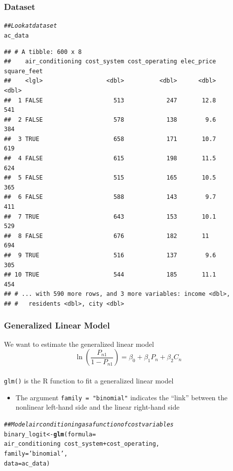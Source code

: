 \documentclass{beamer}\usepackage[]{graphicx}\usepackage[]{color}
\makeatletter
\newcommand{\hlstr}[1]{\textcolor[rgb]{0.192,0.494,0.8}{#1}}%
\newcommand{\hlcom}[1]{\textcolor[rgb]{0.678,0.584,0.686}{\textit{#1}}}%
\newcommand{\hlopt}[1]{\textcolor[rgb]{0,0,0}{#1}}%
\newcommand{\hlstd}[1]{\textcolor[rgb]{0.345,0.345,0.345}{#1}}%
\newcommand{\hlkwb}[1]{\textcolor[rgb]{0.69,0.353,0.396}{#1}}%
\newcommand{\hlkwc}[1]{\textcolor[rgb]{0.333,0.667,0.333}{#1}}%
\newcommand{\hlkwd}[1]{\textcolor[rgb]{0.737,0.353,0.396}{\textbf{#1}}}%
\newenvironment{kframe}{%
 \def\at@end@of@kframe{}%
 \ifinner\ifhmode%
  \def\at@end@of@kframe{\end{minipage}}%
  \begin{minipage}{\columnwidth}%
 \fi\fi%
 \def\FrameCommand##1{\hskip\@totalleftmargin \hskip-\fboxsep
 \colorbox{shadecolor}{##1}\hskip-\fboxsep
     \hskip-\linewidth \hskip-\@totalleftmargin \hskip\columnwidth}%
 \MakeFramed {\advance\hsize-\width
   \@totalleftmargin\z@ \linewidth\hsize
   \@setminipage}}%
 {\par\unskip\endMakeFramed%
 \at@end@of@kframe}
\newenvironment{knitrout}{}{} %
\makeatother
\begin{document}
\begin{frame}[fragile]\frametitle{Dataset}
\begin{knitrout}\footnotesize
{}\color{fgcolor}\begin{kframe}
\begin{alltt}
\hlcom{## Look at dataset}
\hlstd{ac_data}
\end{alltt}
\begin{verbatim}
## # A tibble: 600 x 8
##    air_conditioning cost_system cost_operating elec_price square_feet
##    <lgl>                  <dbl>          <dbl>      <dbl>       <dbl>
##  1 FALSE                    513            247       12.8         541
##  2 FALSE                    578            138        9.6         384
##  3 TRUE                     658            171       10.7         619
##  4 FALSE                    615            198       11.5         624
##  5 FALSE                    515            165       10.5         365
##  6 FALSE                    588            143        9.7         411
##  7 TRUE                     643            153       10.1         529
##  8 FALSE                    676            182       11           694
##  9 TRUE                     516            137        9.6         305
## 10 TRUE                     544            185       11.1         454
## # ... with 590 more rows, and 3 more variables: income <dbl>,
## #   residents <dbl>, city <dbl>
\end{verbatim}
\end{kframe}
\end{knitrout}
\end{frame}

\begin{frame}[fragile]\frametitle{Generalized Linear Model}
    We want to estimate the generalized linear model
    $$\ln \left( \frac{P_{n1}}{1 - P_{n1}} \right) = \beta_0 + \beta_1 P_n + \beta_2 C_n$$ \\
    \vspace{3ex}
    \texttt{glm()} is the R function to fit a generalized linear model
    \begin{itemize}
        \item The argument \texttt{family = "binomial"} indicates the ``link'' between the nonlinear left-hand side and the linear right-hand side
    \end{itemize}
\begin{knitrout}\footnotesize
{}\color{fgcolor}\begin{kframe}
\begin{alltt}
\hlcom{## Model air conditioning as a function of cost variables}
\hlstd{binary_logit} \hlkwb{<-} \hlkwd{glm}\hlstd{(}\hlkwc{formula} \hlstd{=}
                      \hlstd{air_conditioning} \hlopt{~} \hlstd{cost_system} \hlopt{+} \hlstd{cost_operating,}
                    \hlkwc{family} \hlstd{=} \hlstr{'binomial'}\hlstd{,}
                    \hlkwc{data} \hlstd{= ac_data)}
\end{alltt}
\end{kframe}
\end{knitrout}
\end{frame}
\end{document}
